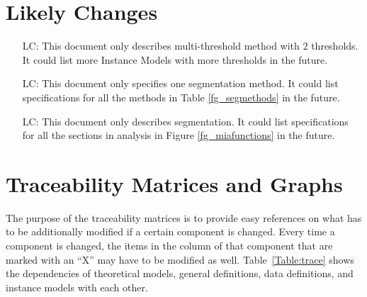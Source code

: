 \documentclass[12pt]{article}
\newcounter{lcnum} %
\begin{document}
\section{Likely Changes}    

\noindent \begin{itemize}

\item[LC\refstepcounter{lcnum}\thelcnum\label{LC_morek}:]This document only describes multi-threshold method with 2 thresholds. It could list more Instance Models with more thresholds in the future.

\item[LC\refstepcounter{lcnum}\thelcnum\label{LC_allmethods}:]This document only specifies one segmentation method. It could list specifications for all the methods in Table \ref{fg_segmethods} in the future.

\item[LC\refstepcounter{lcnum}\thelcnum\label{LC_allanalysis}:]This document only describes segmentation. It could list specifications for all the sections in analysis in Figure \ref{fg_miafunctions} in the future.

\end{itemize}

\section{Traceability Matrices and Graphs}

The purpose of the traceability matrices is to provide easy references on what has to be additionally modified if a certain component is changed.  Every time a component is changed, the items in the column of that component that are marked with an ``X'' may have to be modified as well.  Table~\ref{Table:trace} shows the
dependencies of theoretical models, general definitions, data definitions, and instance models with each other.
\end{document}
